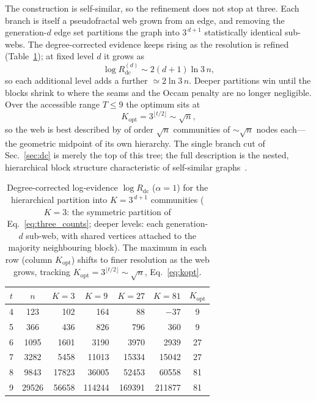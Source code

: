 \documentclass[aps,pre,twocolumn,superscriptaddress,floatfix,nofootinbib]{revtex4-2}
\begin{document}
The construction is self-similar, so the refinement does not stop at three.
Each branch is itself a pseudofractal web grown from an edge, and removing the
generation-$d$ edge set partitions the graph into $3^{\,d+1}$ statistically
identical sub-webs. The degree-corrected evidence keeps rising as the
resolution is refined (Table~\ref{tab:hier}); at fixed level $d$ it grows as
\begin{equation}
\log R_{\mathrm{dc}}^{(d)}\sim 2(d{+}1)\ln 3\,n ,
\label{eq:sloped}
\end{equation}
so each additional level adds a further $\simeq 2\ln 3\,n$. Deeper partitions
win until the blocks shrink to where the seams and the Occam penalty are no
longer negligible. Over the accessible range $T\le 9$ the optimum sits at
\begin{equation}
K_{\mathrm{opt}}=3^{\lfloor t/2\rfloor}\sim\sqrt{n},
\label{eq:kopt}
\end{equation}
so the web is best described by of order $\sqrt{n}$ communities of $\sim\sqrt{n}$
nodes each---the geometric midpoint of its own hierarchy. The single branch cut
of Sec.~\ref{sec:dc} is merely the top of this tree; the full description is the
nested, hierarchical block structure characteristic of self-similar
graphs~\cite{peixoto2014hierarchical}.

\begin{table}[t]
\centering
\begin{ruledtabular}
\begin{tabular}{c c r r r r c}
$t$ & $n$ & \multicolumn{1}{c}{$K{=}3$} & \multicolumn{1}{c}{$K{=}9$}
& \multicolumn{1}{c}{$K{=}27$} & \multicolumn{1}{c}{$K{=}81$}
& $K_{\mathrm{opt}}$\\
\hline
4 & 123   & 102   & 164    & 88     & $-37$  & 9\\
5 & 366   & 436   & 826    & 796    & 360    & 9\\
6 & 1095  & 1601  & 3190   & 3970   & 2939   & 27\\
7 & 3282  & 5458  & 11013  & 15334  & 15042  & 27\\
8 & 9843  & 17823 & 36005  & 52453  & 60558  & 81\\
9 & 29526 & 56658 & 114244 & 169391 & 211877 & 81\\
\end{tabular}
\end{ruledtabular}
\caption{Degree-corrected log-evidence $\log R_{\mathrm{dc}}$ ($\alpha=1$) for
the hierarchical partition into $K=3^{\,d+1}$ communities ($K{=}3$: the
symmetric partition of Eq.~\eqref{eq:three_counts}; deeper levels: each
generation-$d$ sub-web, with shared vertices attached to the majority
neighbouring block). The maximum in each
row (column $K_{\mathrm{opt}}$) shifts to finer resolution as the web grows,
tracking $K_{\mathrm{opt}}=3^{\lfloor t/2\rfloor}\sim\sqrt{n}$,
Eq.~\eqref{eq:kopt}.}
\label{tab:hier}
\end{table}
\end{document}
